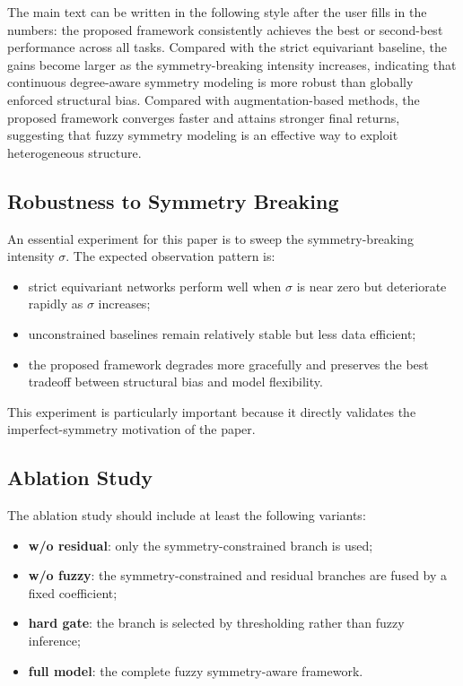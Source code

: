 \documentclass[lettersize,journal]{IEEEtran}
\begin{document}
The main text can be written in the following style after the user fills in the numbers: the proposed framework consistently achieves the best or second-best performance across all tasks. Compared with the strict equivariant baseline, the gains become larger as the symmetry-breaking intensity increases, indicating that continuous degree-aware symmetry modeling is more robust than globally enforced structural bias. Compared with augmentation-based methods, the proposed framework converges faster and attains stronger final returns, suggesting that fuzzy symmetry modeling is an effective way to exploit heterogeneous structure.

\subsection{Robustness to Symmetry Breaking}
An essential experiment for this paper is to sweep the symmetry-breaking intensity $\sigma$. The expected observation pattern is:
\begin{itemize}
\item strict equivariant networks perform well when $\sigma$ is near zero but deteriorate rapidly as $\sigma$ increases;
\item unconstrained baselines remain relatively stable but less data efficient;
\item the proposed framework degrades more gracefully and preserves the best tradeoff between structural bias and model flexibility.
\end{itemize}

This experiment is particularly important because it directly validates the imperfect-symmetry motivation of the paper.

\subsection{Ablation Study}
The ablation study should include at least the following variants:
\begin{itemize}
\item \textbf{w/o residual}: only the symmetry-constrained branch is used;
\item \textbf{w/o fuzzy}: the symmetry-constrained and residual branches are fused by a fixed coefficient;
\item \textbf{hard gate}: the branch is selected by thresholding rather than fuzzy inference;
\item \textbf{full model}: the complete fuzzy symmetry-aware framework.
\end{itemize}
\end{document}

